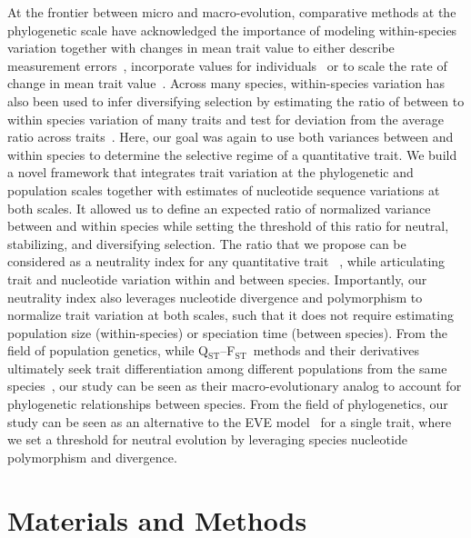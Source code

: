 \documentclass{article}
\newcommand{\Qst}{Q$_\text{ST}$}
\newcommand{\Fst}{F$_\text{ST}$}
\newcommand{\QstFst}{\Qst--\Fst}
\begin{document}
At the frontier between micro and macro-evolution, comparative methods at the phylogenetic scale have acknowledged the importance of modeling within-species variation together with changes in mean trait value to either describe measurement errors~\citep{lynch_methods_1991, hansen_interpreting_2012}, incorporate values for individuals~\citep{felsenstein_comparative_2008} or to scale the rate of change in mean trait value~\citep{kostikova_bridging_2016, gaboriau_multiplatform_2020, gaboriau_exploring_2023}.
Across many species, within-species variation has also been used to infer diversifying selection by estimating the ratio of between to within species variation of many traits and test for deviation from the average ratio across traits~\citep{rohlfs_modeling_2014, rohlfs_phylogenetic_2015}.
Here, our goal was again to use both variances between and within species to determine the selective regime of a quantitative trait.
We build a novel framework that integrates trait variation at the phylogenetic and population scales together with estimates of nucleotide sequence variations at both scales.
It allowed us to define an expected ratio of normalized variance between and within species while setting the threshold of this ratio for neutral, stabilizing, and diversifying selection.
The ratio that we propose can be considered as a neutrality index for any quantitative trait ~\citep{lynch_rate_1990}, while articulating trait and nucleotide variation within and between species.
Importantly, our neutrality index also leverages nucleotide divergence and polymorphism to normalize trait variation at both scales, such that it does not require estimating population size (within-species) or speciation time (between species).
From the field of population genetics, while \QstFst\ methods and their derivatives ultimately seek trait differentiation among different populations from the same species~\citep{pujol_are_2008, ovaskainen_new_2011}, our study can be seen as their macro-evolutionary analog to account for phylogenetic relationships between species.
From the field of phylogenetics, our study can be seen as an alternative to the EVE model~\citep{rohlfs_modeling_2014, rohlfs_phylogenetic_2015} for a single trait, where we set a threshold for neutral evolution by leveraging species nucleotide polymorphism and divergence.


\section*{Materials and Methods}\label{sec:materials-and-methods}
\end{document}

